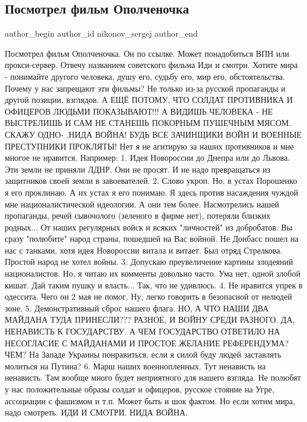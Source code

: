  
 
 
 
 
 
\subsection{Посмотрел фильм Ополченочка}
\label{sec:15_11_2021.fb.nikonov_sergej.1.film_opolchenochka}
 
\ifcmt
 author_begin
   author_id nikonov_sergej
 author_end
\fi

Посмотрел фильм Ополченочка. Он по ссылке. Может понадобиться ВПН или
прокси-сервер. Отвечу названием советского фильма Иди и смотри. Хотите мира -
понимайте другого человека, душу его, судьбу его, мир его, обстоятельства.
Почему у нас запрещают эти фильмы? Не только из-за русской пропаганды и другой
позиции, взглядов. А ЕЩЁ ПОТОМУ, ЧТО СОЛДАТ ПРОТИВНИКА И ОФИЦЕРОВ ЛЮДЬМИ
ПОКАЗЫВАЮТ!!! А ВИДИШЬ ЧЕЛОВЕКА - НЕ ВЫСТРЕЛИШЬ И САМ НЕ СТАНЕШЬ  ПОКОРНЫМ
ПУШЕЧНЫМ МЯСОМ. СКАЖУ ОДНО- .НИДА ВОЙНА! БУДЬ ВСЕ ЗАЧИНЩИКИ ВОЙН И ВОЕННЫЕ
ПРЕСТУПНИКИ ПРОКЛЯТЫ! Нет я не агитирую за наших противников и мне многое не
нравится. Например: 1. Идея Новороссии до Днепра или до Львова. Эти земли не
приняли ЛДНР. Они не просят. И не надо превращаться из защитников своей земли в
завоевателей. 2. Слово укроп. Но, в устах Порошенко я его проклинаю. А их устах
я его понимаю. Я здесь против насаждения чуждой мне националистической
идеологии. А они тем более. Насмотрелись нашей пропаганды, речей сывочолого
(зеленого в фирме нет), потеряли близких родных... От наших регулярных войск и
всяких "личностей" из добробатов. Вы сразу "полюбите" народ страны, пошедшей на
Вас войной. Не Донбасс пошел на нас с танками, хотя идея Новороссии витала и
витает. Был отряд Стрелкова. Простой народ не хотел войны. 3. Допускаю
преувеличение картины злодеяний националистов. Но, я читаю их комменты довольно
часто. Ума нет, одной злобой кишат. Дай таким пушку и власть... Так, что не
удивлюсь. 4. Не нравится упрек в одессита. Чего он 2 мая не помог. Ну, легко
говорить в безопасной от нелюдей зоне. 5. Демонстративный сброс нашего флага.
НО, А ЧТО НАШИ ДВА МАЙДАНА ТУДА ПРИНЕСЛИ??? РАЗНОЕ, И ВОЙНУ СРЕДИ РАЗНОГО. ДА,
НЕНАВИСТЬ К ГОСУДАРСТВУ. А ЧЕМ ГОСУДАРСТВО ОТВЕТИЛО НА НЕСОГЛАСИЕ С МАЙДАНАМИ И
ПРОСТОЕ ЖЕЛАНИЕ РЕФЕРЕНДУМА? ЧЕМ? На Западе Украины понравиться, если я силой
буду людей заставлять молиться на Путина? 6. Марш наших военнопленных. Тут
ненависть на ненависть. Там вообще много будет неприятного для нашего взгляда.
Не полюбят  у нас положительные образы солдат и офицеров, русское стояние на
Угре, ассоциации с фашизмом и т.п. Может быть и шок фактом. Но если хотим мира,
надо смотреть. ИДИ И СМОТРИ. НИДА ВОЙНА.

